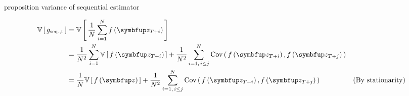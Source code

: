 
\begin{theoremEnd}{proposition}
  variance of sequential estimator
\end{theoremEnd}
\begin{proofEnd}
  \begin{align}
    \V{g_{\mathrm{seq., t}}}
    &= \V{ \frac{1}{N} \sum_{i=1}^{N} f\left(\vz_{T + i}\right) } \\
    &= \frac{1}{N^2} \sum_{i=1}^{N} \V{ f\left(\vz_{T+i}\right) }  + \frac{1}{N^2} \sum_{i=1,\, i \leq j}^{N} \Cov{ f\left(\vz_{T+i}\right), f\left(\vz_{T+j}\right) }  \\
    &= \frac{1}{N} \V{ f\left(\vz\right) }  + \frac{1}{N^2} \sum_{i=1,\, i \leq j}^{N} \Cov{ f\left(\vz_{T+i}\right), f\left(\vz_{T+j}\right) }  &\text{(By stationarity)}  \\
  \end{align}
\end{proofEnd}

